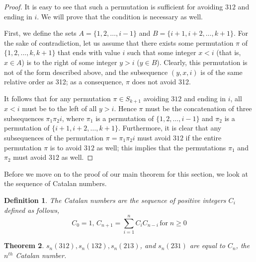 \documentclass[11pt,letterpaper,twoside,english]{article}
\theoremstyle{theorem}
\newtheorem{theorem}{Theorem}[section]
\newtheorem{definition}[theorem]{Definition}
\theoremstyle{remark}
\begin{document}
\begin{proof}

It is easy to see that such a permutation is sufficient for avoiding $312$ and ending in $i$. We will prove that the condition is necessary as well.

First, we define the sets $A=\{1,2,\ldots,i-1\}$ and $B=\{i+1,i+2,\ldots,k+1\}$. For the sake of contradiction, let us assume that there exists some permutation $\pi$ of $\{1,2,...,k,k+1\}$ that ends with value $i$ such that some integer $x < i$ (that is, $x \in A$) is to the right of some integer $y > i$ ($y \in B$). Clearly, this permutation is not of the form described above, and the subsequence $(y, x, i)$ is of the same relative order as 312; as a consequence, $\pi$ does not avoid 312.

It follows that for any permutation $\pi\in S_{k+1}$ avoiding $312$ and ending in $i$, all $x < i$ must be to the left of all $y > i$. Hence $\pi$ must be the concatenation of three subsequences $\pi_1 \pi_2 i$, where $\pi_1$ is a permutation of $\{1, 2, \ldots, i-1\}$ and $\pi_2$ is a permutation of $\{i+1, i+2, \ldots, k+1\}$. Furthermore, it is clear that any subsequences of the permutation $\pi = \pi_1 \pi_2 i$ must avoid $312$ if the entire permutation $\pi$ is to avoid $312$ as well; this implies that the permutations $\pi_1$ and $\pi_2$ must avoid $312$ as well.
\end{proof}

Before we move on to the proof of our main theorem for this section, we look at the sequence of Catalan numbers.

\begin{definition}
The Catalan numbers are the sequence of positive integers $C_i$ defined as follows,
$$C_0=1, \, C_{n+1}=\sum_{i=1}^n C_iC_{n-i} \, \text{for} \; n \geq 0$$
\end{definition}

\begin{theorem}
$s_n(312), s_n(132), s_n(213)$, and $s_n(231)$ are equal to $C_n$, the $n^{th}$ Catalan number.
\end{theorem}
\end{document}
